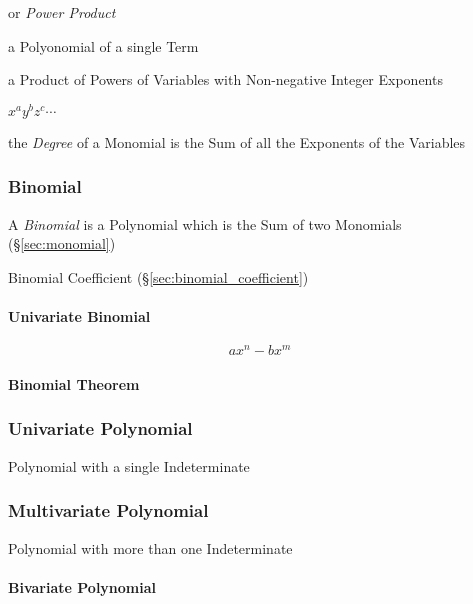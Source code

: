 or \emph{Power Product}

a Polyonomial of a single Term

a Product of Powers of Variables with Non-negative Integer Exponents

$x^a y^b z^c \cdots$

the \emph{Degree} of a Monomial is the Sum of all the Exponents of the
Variables



\subsubsection{Binomial}\label{sec:binomial}

A \emph{Binomial} is a Polynomial which is the Sum of two Monomials
(\S\ref{sec:monomial})

Binomial Coefficient (\S\ref{sec:binomial_coefficient})



\paragraph{Univariate Binomial}\label{sec:univariate_binomial}\hfill

\[
  a x^n - b x^m
\]


\paragraph{Binomial Theorem}\label{sec:binomial_theorem}\hfill



\subsubsection{Univariate Polynomial}\label{sec:univariate_polynomial}

Polynomial with a single Indeterminate



\subsubsection{Multivariate Polynomial}\label{sec:multivariate_polynomial}

Polynomial with more than one Indeterminate



\paragraph{Bivariate Polynomial}\label{sec:bivariate_polynomial}\hfill

